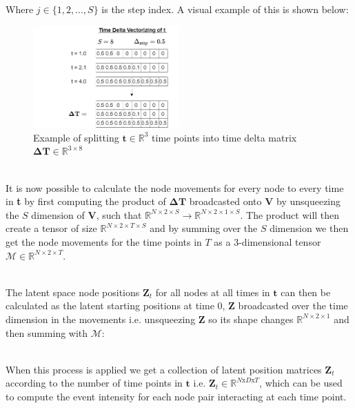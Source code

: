 Where $j \in \{1,2,...,S\}$ is the step index. A visual example of this is shown below:
\begin{figure}[H]
    \centering
    \includegraphics[width=0.5\textwidth]{0_images/time_deltas.png}
    \caption{Example of splitting $\textbf{t} \in \mathbb{R}^3$ time points into time delta matrix $\boldsymbol{\Delta}\textbf{T} \in \mathbb{R}^{3 \times 8}$}
    \label{Method:Vectorized:fig:time_delta_split}
\end{figure}
\\
\noindent
It is now possible to calculate the node movements for every node to every time in \textbf{t} by first computing the product of $\boldsymbol{\Delta}\textbf{T}$ broadcasted\cite{BroadcastingDocumentation} onto $\textbf{V}$ by unsqueezing the $S$ dimension of $\textbf{V}$, such that $\mathbb{R}^{N \times 2 \times S} \rightarrow \mathbb{R}^{N \times 2 \times 1 \times S}$. The product will then create a tensor of size $\mathbb{R}^{N \times 2 \times T \times S}$ and by summing over the $S$ dimension we then get the node movements for the time points in $T$ as a 3-dimensional tensor $\boldsymbol{\mathcal{M}} \in \mathbb{R}^{N \times 2 \times T}$.

\\
The latent space node positions $\textbf{Z}_{t}$ for all nodes at all times in $\textbf{t}$ can then be calculated as the latent starting positions at time 0, $\textbf{Z}$ broadcasted over the time dimension in the movements i.e. unsqueezing $\textbf{Z}$ so its shape changes $\mathbb{R}^{N \times 2 \times 1}$ and then summing with $\boldsymbol{\mathcal{M}}$:

\\
When this process is applied we get a collection of latent position matrices $\textbf{Z}_t$ according to the number of time points in $\textbf{t}$ i.e. $\textbf{Z}_t \in \mathbb{R}^{N\text{x}D\text{x}T}$, which can be used to compute the event intensity for each node pair interacting at each time point.

